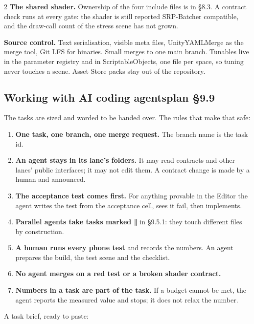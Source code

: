 \documentclass[10pt,a4paper,landscape]{article}
\newcommand{\planmark}[1]{{\normalfont\fontsize{7.5}{9}\selectfont\color{muted}\if\relax\detokenize{#1}\relax\else plan #1\fi}}
\newcommand{\sub}[2]{\subsection[#1]{#1\hfill\planmark{#2}}}
\begin{document}
\begin{multicols}{2}
\textbf{The shared shader.} Ownership of the four include files is in §8.3. A contract check runs at every gate: the shader is still reported SRP-Batcher compatible, and the draw-call count of the stress scene has not grown.\par

\textbf{Source control.} Text serialisation, visible meta files, UnityYAMLMerge as the merge tool, Git LFS for binaries. Small merges to one main branch. Tunables live in the parameter registry and in ScriptableObjects, one file per space, so tuning never touches a scene. Asset Store packs stay out of the repository.\par
\end{multicols}

\clearpage\sub{Working with AI coding agents}{§9.9}
The tasks are sized and worded to be handed over. The rules that make that safe:\par

\begin{enumerate}
  \item \textbf{One task, one branch, one merge request.} The branch name is the task id.
  \item \textbf{An agent stays in its lane's folders.} It may read contracts and other lanes' public interfaces; it may not edit them. A contract change is made by a human and announced.
  \item \textbf{The acceptance test comes first.} For anything provable in the Editor the agent writes the test from the acceptance cell, sees it fail, then implements.
  \item \textbf{Parallel agents take tasks marked ‖} in §9.5.1: they touch different files by construction.
  \item \textbf{A human runs every phone test} and records the numbers. An agent prepares the build, the test scene and the checklist.
  \item \textbf{No agent merges on a red test or a broken shader contract.}
  \item \textbf{Numbers in a task are part of the task.} If a budget cannot be met, the agent reports the measured value and stops; it does not relax the number.
\end{enumerate}

A task brief, ready to paste:\par
\end{document}
